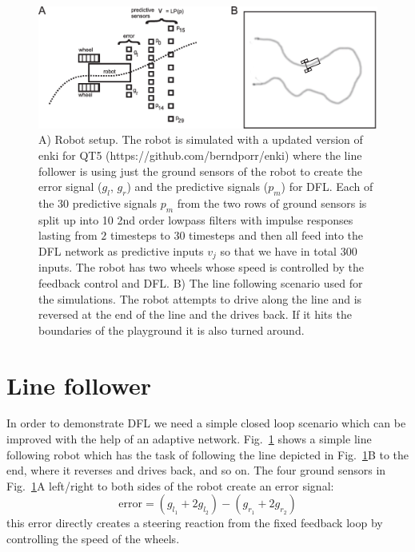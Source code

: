 \documentclass{llncs}
\begin{document}
\begin{figure}[h!]
  \centering
  \includegraphics[width=\columnwidth]{linefollower_robot_playground}
  \caption{A) Robot setup. The robot is simulated with a updated
    version of enki for QT5 (https://github.com/berndporr/enki)
    where the line follower is using just the ground sensors of the
    robot to create the error signal ($g_l$, $g_r$) and the predictive signals ($p_m$)
    for DFL. Each of the 30 predictive signals $p_m$ from the two rows of ground sensors
    is split up into 10 2nd order lowpass filters with impulse responses
    lasting from $2$ timesteps to $30$ timesteps and then all feed into the DFL
    network as predictive inputs $v_j$ so that we have in total 300 inputs.
    The robot has two wheels whose speed is controlled
    by the feedback control and DFL.
    B) The line following scenario used for the simulations. The robot
    attempts to drive along the line and is reversed at the end of the
    line and the drives back. If it hits the boundaries of the playground
    it is also turned around.
    \label{linefollower_robot_playground}}
\end{figure}




\section{Line follower}
In order to demonstrate DFL we need a simple closed loop scenario
which can be improved with the help of an adaptive network.
Fig.~\ref{linefollower_robot_playground} shows a simple line following
robot which has the task of following the line depicted in
Fig.~\ref{linefollower_robot_playground}B to the end, where it
reverses and drives back, and so on. The four ground sensors in
Fig.~\ref{linefollower_robot_playground}A left/right to both sides
of the robot create an error signal:
\begin{equation}
\mathrm{error} = (g_{l_1}+2 g_{l_2})-(g_{r_1}+2 g_{r_2}) \label{line_error}
\end{equation}
this error directly creates a steering reaction from the fixed
feedback loop by controlling the speed of the wheels.
\end{document}
